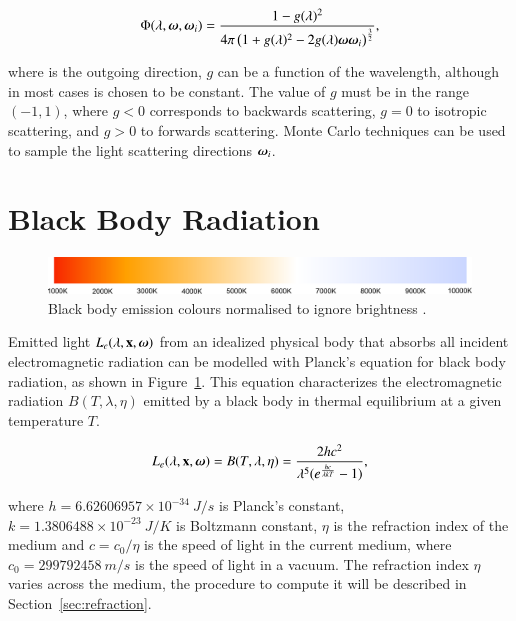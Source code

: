 \begin{equation}
\Phi (\lambda, \boldsymbol{\omega}, \boldsymbol{\omega}_i) = \frac{1 - g(\lambda)^2}{4 \pi\left(1 + g(\lambda)^2 - 2 g(\lambda) \boldsymbol{\omega} \boldsymbol{\omega}_i\right)^{\frac{3}{2}}},
\end{equation}

where is the outgoing direction, $g$ can be a function of the wavelength, although in most cases is chosen to be constant.
The value of $g$ must be in the range $(-1, 1)$, where $g < 0$ corresponds to backwards scattering, $g = 0$ to isotropic scattering, and $g > 0$ to forwards scattering.
Monte Carlo techniques can be used to sample the light scattering directions $\boldsymbol{\omega}_i$.

\section{Black Body Radiation}
\label{sec:black_body_radiation}

\begin{figure}[htbp!]
	\centering
	\includegraphics[width=\textwidth]{img/black_body_diag}
	\caption{Black body emission colours normalised to ignore brightness \cite{BlackBody}.}
	\label{fig:black_body_diag}
\end{figure}

Emitted light $L_e(\lambda, \mathbf{x}, \boldsymbol{\omega})$ from an idealized physical body that absorbs all incident electromagnetic radiation can be modelled with Planck's equation for black body radiation, as shown in Figure~\ref{fig:black_body_diag}.
This equation characterizes the electromagnetic radiation $B(T, \lambda, \eta)$ emitted by a black body in thermal equilibrium at a given temperature $T$.

\begin{equation}
L_e(\lambda, \mathbf{x}, \boldsymbol{\omega}) = B(T, \lambda, \eta) = \frac{2 h c^2}{\lambda^5  (e ^\frac{h c}{\lambda k T} - 1)},
\end{equation}

where $h = 6.62606957 \times 10^{-34}~J/s$ is Planck's constant, $k = 1.3806488 \times 10^{-23}~J/K$ is Boltzmann constant, $\eta$ is the refraction index of the medium and $c =  c_0 / \eta$ is the speed of light in the current medium, where $c_0 = 299792458~m/s$ is the speed of light in a vacuum. 
The refraction index $\eta$ varies across the medium, the procedure to compute it will be described in Section~\ref{sec:refraction}.

